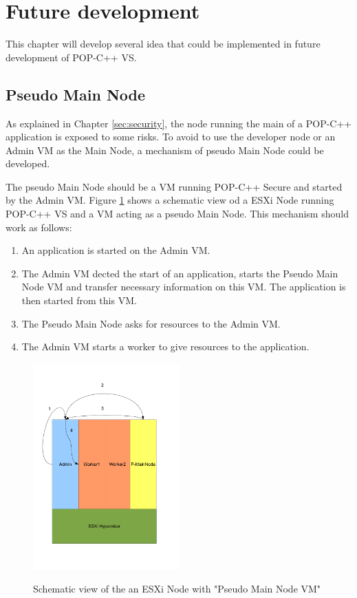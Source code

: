 \section{Future development}
\label{sec:future}

This chapter will develop several idea that could be implemented in future development of POP-C++ VS. 

\subsection{Pseudo Main Node}
As explained in Chapter \ref{sec:security}, the node running the main of a POP-C++ application is exposed to some risks. To avoid to use the developer node or an Admin VM as the Main Node, a mechanism of pseudo Main Node could be developed. \s

The pseudo Main Node should be a VM running POP-C++ Secure and started by the Admin VM. Figure \ref{fig:pseudomain} shows a schematic view od a ESXi Node running POP-C++ VS and a VM acting as a pseudo Main Node. This mechanism should work as follows:

\begin{enumerate}
\item An application is started on the Admin VM.
\item The Admin VM dected the start of an application, starts the Pseudo Main Node VM and transfer necessary information on this VM. The application is then started from this VM. 
\item The Pseudo Main Node asks for resources to the Admin VM. 
\item The Admin VM starts a worker to give resources to the application.
\end{enumerate}


\begin{figure}[ht]
	\caption{Schematic view of the an ESXi Node with "Pseudo Main Node VM"}
  	\centering
	\includegraphics[width=0.5\textwidth]{./pic/pseudomain.pdf}
	\label{fig:pseudomain}
\end{figure}

